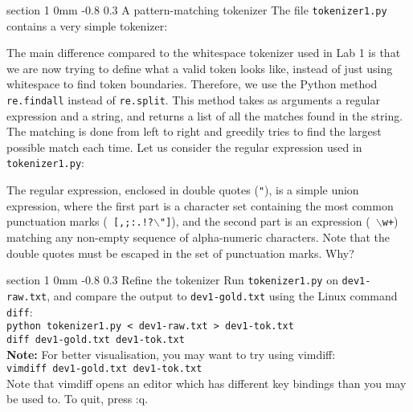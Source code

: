 \documentclass[11pt]{article}
\makeatletter
\newcommand{\newsec}[2]{\section{#1}\label{sec:#2}\noindent}
\renewcommand{\section}{\@startsection
{section}%
{1}%
{0mm}%
{-0.8\baselineskip}%
{0.3\baselineskip}%
{\bfseries\large}}%
\makeatother
\begin{document}
\newsec{A pattern-matching tokenizer}{tokenize}%
The file {\tt tokenizer1.py} contains a very simple tokenizer:
\begin{center}
\fbox{

}
\end{center}
The main difference compared to the whitespace tokenizer used in
Lab 1 is that we are now trying to define what a valid token
looks like, instead of just using whitespace to find token
boundaries. Therefore, we use the Python method {\tt re.findall}
instead of {\tt re.split}. This method takes as arguments a regular
expression and a string, and returns a list of all the matches found
in the string. The matching is done from left to right and greedily
tries to find the largest possible match each time. Let us consider
the regular expression used in {\tt tokenizer1.py}:
\begin{center}
\fbox{

}
\end{center}
The regular expression, enclosed in double quotes ({\tt "}), is a
simple union expression, where the first part is a character set
containing the most common punctuation marks ({\tt
  [,;:.!?$\backslash$"]}), and the second part is an expression ({\tt
  $\backslash$w+}) matching any non-empty sequence of alpha-numeric
characters. Note that the double quotes must be escaped in the set of
punctuation marks. Why?

\newsec{Refine the tokenizer }{refine}%
Run {\tt tokenizer1.py} on {\tt dev1-raw.txt}, and compare the output
to {\tt dev1-gold.txt} using the Linux command {\tt diff}: \\

\noindent
{\tt python tokenizer1.py < dev1-raw.txt > dev1-tok.txt}\\

\noindent
{\tt diff dev1-gold.txt dev1-tok.txt}\\

\textbf{Note:} For better visualisation, you may want to try using vimdiff:\\
{\tt vimdiff dev1-gold.txt dev1-tok.txt}\\
Note that vimdiff opens an editor which has different key bindings than
you may be used to. To quit, press :q.\\
\end{document}
